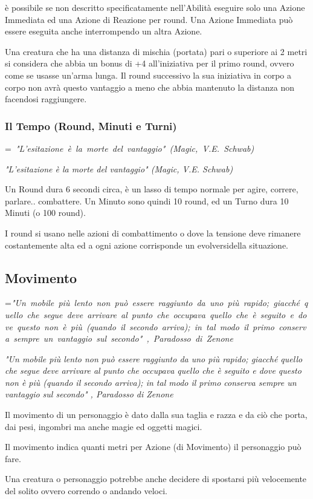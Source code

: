 \documentclass[a4paper,11pt,twoside,openany]{book}
\makeatletter
\newcommand{\mybox}[1]{%
	\setbox0=\hbox{#1}%
	\setlength{\@tempdima}{\dimexpr\wd0+13pt}%
	\begin{tcolorbox}[boxrule=0.5pt,arc=4pt, breakable,enhanced,
		left=6pt,right=6pt,top=6pt,bottom=6pt,boxsep=0pt,width=\@tempdima]
		#1
	\end{tcolorbox}
}
\makeatother
\begin{document}
è possibile se non descritto specificatamente nell'Abilità eseguire solo una Azione Immediata ed una Azione di Reazione per round. Una Azione Immediata può essere eseguita anche interrompendo un altra Azione.

Una creatura che ha una distanza di mischia (portata) pari o superiore
ai 2 metri si considera che abbia un bonus di +4 all'iniziativa per
il primo round, ovvero come se usasse un'arma lunga. Il round successivo
la sua iniziativa in corpo a corpo non avrà questo vantaggio a meno
che abbia mantenuto la distanza non facendosi raggiungere.

\subsubsection{Il Tempo (Round, Minuti e Turni)}

\label{il-tempo-round-minuti-e-turni}
\mybox{\textit{
"L'esitazione è la morte del vantaggio" (Magic, V.E. Schwab)}}\medskip

Un Round dura 6 secondi circa, è un lasso di tempo normale per agire, correre, parlare.. combattere. Un Minuto sono quindi 10 round, ed un Turno dura 10 Minuti (o 100 round).

I round si usano nelle azioni di combattimento o dove la tensione deve rimanere costantemente alta ed a ogni azione corrisponde un evolversidella situazione.

\pagebreak

\subsection{Movimento}

\label{movimento}

\mybox{\textit{"Un mobile più lento non può essere raggiunto da uno più rapido; giacché quello che segue deve arrivare al punto che occupava quello che è seguito e dove questo non è più (quando il secondo arriva); in tal modo il primo conserva sempre un vantaggio sul secondo" , Paradosso di Zenone
}}\medskip

Il movimento di un personaggio è dato dalla sua taglia e razza e da ciò che porta, dai pesi, ingombri ma anche magie ed oggetti magici.

Il movimento indica quanti metri per Azione (di Movimento) il personaggio può fare.

Una creatura o personaggio potrebbe anche decidere di spostarsi più velocemente del solito ovvero correndo o andando veloci.
\end{document}
